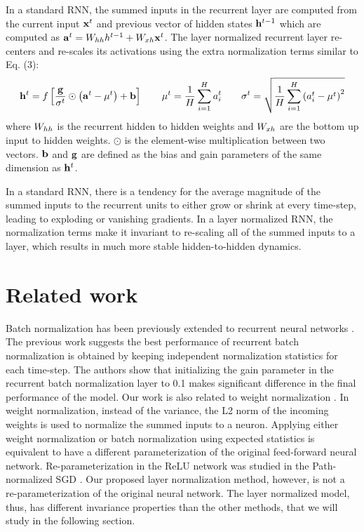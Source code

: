 \documentclass{article}
\begin{document}
In a standard RNN, the summed inputs in the recurrent layer are computed from the current input ${\bold x}^t$ and previous vector of hidden states ${\bold h}^{t-1}$ which are computed as ${\bold a}^t = {W}_{hh} {h}^{t-1} + {W}_{xh} {\bold x}^t$. The layer normalized recurrent layer re-centers and re-scales its activations using the extra normalization terms similar to Eq. (3):
\begin{equation}
{\bold h}^t = {f}\left[{{\bold g}\over\sigma^t}\odot\left({\bold a}^t - \mu^t\right) + {\bold b} \right]
\qquad
\mu^t = \frac{1}{H}\sum_{i = 1}^H  {a_i^t}
\qquad
\sigma^t = \sqrt{\frac{1}{H}\sum_{i = 1}^H  \left( {a_i^t} - \mu^t \right)^2}
\end{equation}
where ${W}_{hh}$ is the recurrent hidden to hidden weights and ${W}_{xh}$ are the bottom up input to hidden weights. $\odot$ is the element-wise multiplication between two vectors. ${\bold b}$ and ${\bold g}$ are defined as the bias and gain parameters of the same dimension as ${\bold h}^t$.

In a standard RNN, there is a tendency for the average magnitude of the summed inputs to the recurrent units to either grow or shrink at every time-step, leading to exploding or vanishing gradients. In a layer normalized RNN,  the normalization terms make it invariant to re-scaling all of the summed inputs to a layer, which results in much more stable hidden-to-hidden dynamics. 

\section{Related work}
Batch normalization has been previously extended to recurrent neural networks \citep{laurent2015batch, amodei2015deep, cooijmans2016recurrent}. The previous work \citep{cooijmans2016recurrent} suggests the best performance of recurrent batch normalization is obtained by keeping independent normalization statistics for each time-step. The authors show that initializing the gain parameter in the recurrent batch normalization layer to 0.1 makes significant difference in the final performance of the model. Our work is also related to weight normalization \citep{salimans2016weight}.  In weight normalization, instead of the variance, the L2 norm of the incoming weights is used to normalize the summed inputs to a neuron. Applying either weight normalization or batch normalization using expected statistics is equivalent to have a different parameterization of the original feed-forward neural network. Re-parameterization in the ReLU network was studied in the Path-normalized SGD \citep{neyshabur2015path}. Our proposed layer normalization method, however, is not a re-parameterization of the original neural network. The layer normalized model, thus, has different invariance properties than the other methods, that we will study in the following section.
\end{document}
